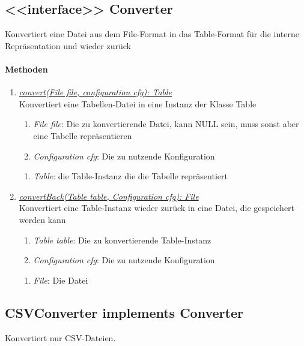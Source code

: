 \subsection{<{<{interface}>}> Converter}
Konvertiert eine Datei aus dem File-Format in das Table-Format für die interne Repräsentation und wieder zurück \\

\paragraph{Methoden}
\begin{enumerate}[+]
	\item \underline{\textit{convert(File file, configuration cfg): Table}} \\
	Konvertiert eine Tabellen-Datei in eine Instanz der Klasse Table
	
	\begin{enumerate}[$\bullet$]
		\item \textit{File file}: Die zu konvertierende Datei, kann NULL sein, muss sonst aber eine Tabelle repräsentieren
		\item \textit{Configuration cfg}: Die zu nutzende Konfiguration
	\end{enumerate}
	\vspace{-0.2cm}
	\begin{enumerate}[$\circ$]
		\item \textit{Table}: die Table-Instanz die die Tabelle repräsentiert
	\end{enumerate}

	\item \underline{\textit{convertBack(Table table, Configuration cfg): File}} \\
	Konvertiert eine Table-Instanz wieder zurück in eine Datei, die gespeichert werden kann
	\begin{enumerate}[$\bullet$]
		\item \textit{Table table}: Die zu konvertierende Table-Instanz
		\item \textit{Configuration cfg}: Die zu nutzende Konfiguration
	\end{enumerate}
	\vspace{-0.2cm}
	\begin{enumerate}[$\circ$]
		\item \textit{File}: Die Datei
	\end{enumerate}
\end{enumerate}


\subsection{CSVConverter implements Converter}
Konvertiert nur CSV-Dateien. \\

